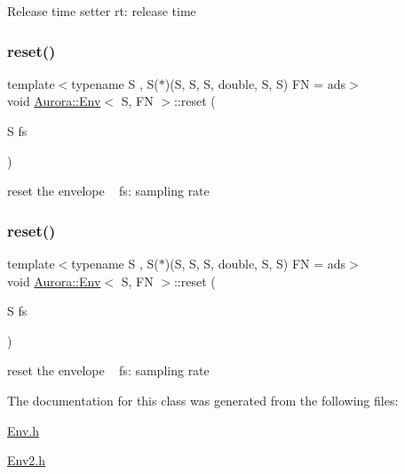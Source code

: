 Release time setter rt\+: release time \mbox{\label{class_aurora_1_1_env_a12db5d285b749a7e1fed988d344d3bc9}} 
\subsubsection{\texorpdfstring{reset()}{reset()}\hspace{0.1cm}{\footnotesize\ttfamily [1/2]}}
{\footnotesize\ttfamily template$<$typename S , S($\ast$)(\+S, S, S, double, S, S) FN = ads$>$ \\
void \hyperlink{class_aurora_1_1_env}{Aurora\+::\+Env}$<$ S, FN $>$\+::reset (\begin{DoxyParamCaption}\item[{S}]{fs }\end{DoxyParamCaption})\hspace{0.3cm}{\ttfamily [inline]}}

reset the envelope ~\newline
fs\+: sampling rate \mbox{\label{class_aurora_1_1_env_a12db5d285b749a7e1fed988d344d3bc9}} 
\subsubsection{\texorpdfstring{reset()}{reset()}\hspace{0.1cm}{\footnotesize\ttfamily [2/2]}}
{\footnotesize\ttfamily template$<$typename S , S($\ast$)(\+S, S, S, double, S, S) FN = ads$>$ \\
void \hyperlink{class_aurora_1_1_env}{Aurora\+::\+Env}$<$ S, FN $>$\+::reset (\begin{DoxyParamCaption}\item[{S}]{fs }\end{DoxyParamCaption})\hspace{0.3cm}{\ttfamily [inline]}}

reset the envelope ~\newline
fs\+: sampling rate 

The documentation for this class was generated from the following files\+:\begin{DoxyCompactItemize}
\item 
\hyperlink{_env_8h}{Env.\+h}\item 
\hyperlink{_env2_8h}{Env2.\+h}\end{DoxyCompactItemize}
